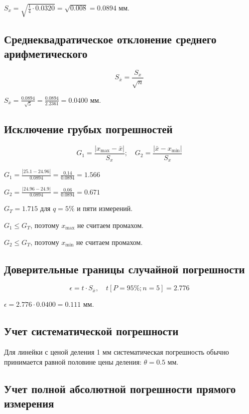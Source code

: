 \documentclass[12pt, a4paper]{article}
\begin{document}
	$S_x = \sqrt{\frac{1}{4} \cdot 0.0320} = \sqrt{0.008} = 0.0894$ мм.
	
	\subsection*{Среднеквадратическое отклонение среднего арифметического}
	
	$$S_{\bar{x}} = \frac{S_x}{\sqrt{n}}$$
	
	$S_{\bar{x}} = \frac{0.0894}{\sqrt{5}} = \frac{0.0894}{2.2361} = 0.0400$ мм.
	
	\subsection*{Исключение грубых погрешностей}
	
	$$G_1 = \frac{|x_{\text{max}} - \bar{x}|}{S_x}; \quad G_2 = \frac{|\bar{x} - x_{\text{min}}|}{S_x}$$
	
	$G_1 = \frac{|25.1 - 24.96|}{0.0894} = \frac{0.14}{0.0894} = 1.566$
	
	$G_2 = \frac{|24.96 - 24.9|}{0.0894} = \frac{0.06}{0.0894} = 0.671$
	
	$G_T = 1.715$ для $q = 5\%$ и пяти измерений.
	
	$G_1 \leq G_T$, поэтому $x_{\text{max}}$ не считаем промахом.
	
	$G_2 \leq G_T$, поэтому $x_{\text{min}}$ не считаем промахом.
	
	\subsection*{Доверительные границы случайной погрешности}
	
	$$\epsilon = t \cdot S_{\bar{x}}, \quad t [P = 95\%; n = 5] = 2.776$$
	
	$\epsilon = 2.776 \cdot 0.0400 = 0.111$ мм.
	
	\subsection*{Учет систематической погрешности}
	
	Для линейки с ценой деления 1 мм систематическая погрешность обычно принимается равной половине цены деления: $\theta = 0.5$ мм.
	
	\subsection*{Учет полной абсолютной погрешности прямого измерения}
	
\end{document}
